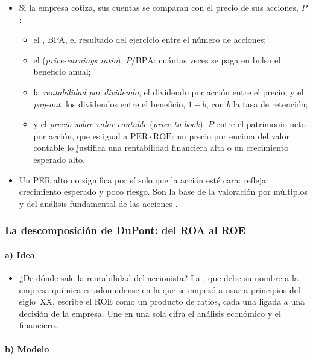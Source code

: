 \documentclass[11pt]{article}
\begin{document}
\begin{itemize}
\item Si la empresa cotiza, sus cuentas se comparan con el precio de sus acciones, $P$:
  \begin{itemize}
  \item el , BPA, el resultado del ejercicio entre el número de acciones;
  \item el  (\emph{price-earnings ratio}), $P/\mathrm{BPA}$: cuántas veces se paga en bolsa el beneficio anual;
  \item la \emph{rentabilidad por dividendo}, el dividendo por acción entre el precio, y el \emph{pay-out}, los dividendos entre el beneficio, $1-b$, con $b$ la tasa de retención;
  \item y el \emph{precio sobre valor contable} (\emph{price to book}), $P$ entre el patrimonio neto por acción, que es igual a $\mathrm{PER}\cdot\mathrm{ROE}$: un precio por encima del valor contable lo justifica una rentabilidad financiera alta o un crecimiento esperado alto.
  \end{itemize}
\item Un PER alto no significa por sí solo que la acción esté cara: refleja crecimiento esperado y poco riesgo. Son la base de la valoración por múltiplos y del análisis fundamental de las acciones  .
\end{itemize}

\subsubsection{La descomposición de DuPont: del ROA al ROE}\label{sec:dupont}

\paragraph{a) Idea}

\begin{itemize}
\item ¿De dónde sale la rentabilidad del accionista? La , que debe su nombre a la empresa química estadounidense en la que se empezó a usar a principios del siglo~XX, escribe el ROE como un producto de ratios, cada una ligada a una decisión de la empresa. Une en una sola cifra el análisis económico y el financiero.
\end{itemize}

\paragraph{b) Modelo}
\end{document}
